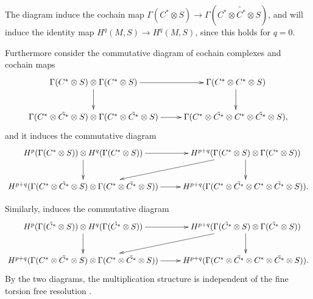 \documentclass[twoside]{article}
\begin{document}
The diagram induce the cochain map $\Gamma(C^*\otimes S)\to \Gamma(C^*\otimes \tilde{C^*}\otimes S)$, and will induce the identity map $H^q(M,S)\to H^q(M,S)$, since this holds for $q=0$.

Furthermore consider the commutative diagram of cochain complexes and cochain maps
\begin{equation*}
\xymatrix{
\Gamma(C^*\otimes S)\otimes\Gamma(C^*\otimes S)\ar[r]\ar[d]&\Gamma(C^*\otimes C^*\otimes S)\ar[d]\\
\Gamma(C^*\otimes \tilde{C^*}\otimes S) \otimes \Gamma(C^*\otimes \tilde{C^*}\otimes S)\ar[r] & \Gamma(C^*\otimes \tilde{C^*}\otimes C^*\otimes \tilde{C^*}\otimes S),\\
}
\end{equation*}
 and it induces the commutative diagram \begin{equation*}
   \xymatrix{
   H^p(\Gamma(C^*\otimes S))\otimes H^q( \Gamma(C^*\otimes S))\ar[r]\ar[d]& H^{p+q}(\Gamma(C^*\otimes S)\otimes \Gamma(C^*\otimes S))\ar[d]\ar[dl]\\
   H^{p+q}(\Gamma(C^*\otimes \tilde{C^*}\otimes S) \otimes \Gamma(C^*\otimes \tilde{C^*}\otimes S))\ar[r]&H^{p+q}(\Gamma(C^*\otimes \tilde{C^*}\otimes C^*\otimes \tilde{C^*}\otimes S)).\\
   }
 \end{equation*}

Similarly, induces the commutative diagram
\begin{equation*}
   \xymatrix{
   H^p(\Gamma(\tilde{C^*}\otimes S))\otimes H^q(\Gamma(\tilde{C^*}\otimes S))\ar[r]\ar[d]& H^{p+q}(\Gamma(\tilde{C^*}\otimes S)\otimes \Gamma(\tilde{C^*}\otimes S))\ar[d]\ar[dl]\\
   H^{p+q}(\Gamma(C^*\otimes \tilde{C^*}\otimes S) \otimes \Gamma(C^*\otimes \tilde{C^*}\otimes S))\ar[r]&H^{p+q}(\Gamma(C^*\otimes \tilde{C^*}\otimes C^*\otimes \tilde{C^*}\otimes S)).\\
   }
 \end{equation*}
 By the two diagrams, the multiplication structure is independent of the fine torsion free resolution \cite{ATspanier}.
\nocite{*}
\printbibliography
\end{document}
